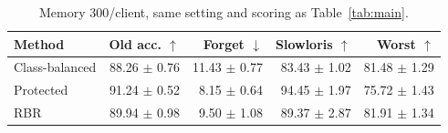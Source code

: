 \begin{table}[t]
\centering
\caption{Memory 300/client, same setting and scoring as Table~\ref{tab:main}.}
\label{tab:capacity}
\footnotesize
\setlength{\tabcolsep}{2.5pt}
\begin{tabular}{lrrrr}
\toprule
Method & Old acc. $\uparrow$ & Forget $\downarrow$ & Slowloris $\uparrow$ & Worst $\uparrow$\\
\midrule
Class-balanced & 88.26 $\pm$ 0.76 & 11.43 $\pm$ 0.77 & 83.43 $\pm$ 1.02 & 81.48 $\pm$ 1.29\\
Protected & 91.24 $\pm$ 0.52 & 8.15 $\pm$ 0.64 & 94.45 $\pm$ 1.97 & 75.72 $\pm$ 1.43\\
RBR & 89.94 $\pm$ 0.98 & 9.50 $\pm$ 1.08 & 89.37 $\pm$ 2.87 & 81.91 $\pm$ 1.34\\
\bottomrule
\end{tabular}
\end{table}
